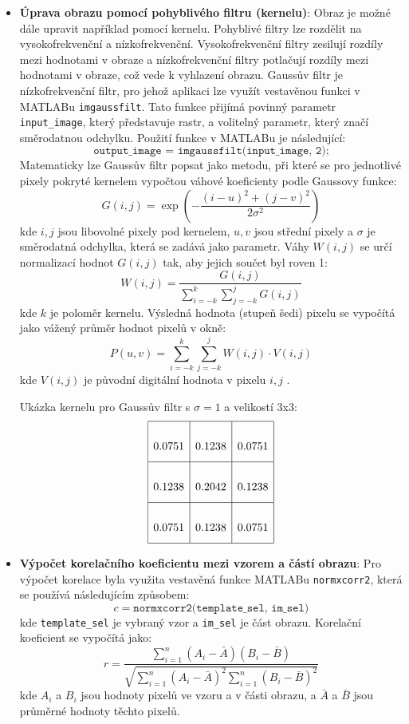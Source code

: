 \begin{itemize}
    \item \textbf{Úprava obrazu pomocí pohyblivého filtru (kernelu)}: Obraz je možné dále upravit například pomocí kernelu. Pohyblivé filtry lze rozdělit na vysokofrekvenční a nízkofrekvenční. Vysokofrekvenční filtry zesilují rozdíly mezi hodnotami v obraze a nízkofrekvenční filtry potlačují rozdíly mezi hodnotami v obraze, což vede k vyhlazení obrazu.\cite{DPZFiltrace} Gaussův filtr je nízkofrekvenční filtr, pro jehož aplikaci lze využít vestavěnou funkci v MATLABu \texttt{imgaussfilt}.\cite{mathworksGauss} Tato funkce přijímá povinný parametr \texttt{input\_image}, který představuje rastr, a volitelný parametr, který značí směrodatnou odchylku. Použití funkce v MATLABu je následující:
    \[
    \texttt{output\_image = imgaussfilt(input\_image, 2);}
    \]
    Matematicky lze Gaussův filtr popsat jako metodu, při které se pro jednotlivé pixely pokryté kernelem vypočtou váhové koeficienty podle Gaussovy funkce:
    \[
    G(i,j) = \exp\left(-\frac{(i-u)^2 + (j-v)^2}{2\sigma^2}\right)
    \]
    kde \(i, j\) jsou libovolné pixely pod kernelem, \(u, v\) jsou střední pixely a \(\sigma\) je směrodatná odchylka, která se zadává jako parametr. Váhy \(W(i, j)\) se určí normalizací hodnot \(G(i, j)\) tak, aby jejich součet byl roven 1:
    \[
    W(i, j) = \frac{G(i, j)}{\sum_{i=-k}^{k} \sum_{j=-k}^{j} G(i, j)}
    \]
    kde \(k\) je poloměr kernelu. Výsledná hodnota (stupeň šedi) pixelu se vypočítá jako vážený průměr hodnot pixelů v okně:
    \[
    P(u,v) = \sum_{i=-k}^{k} \sum_{j=-k}^{j} W(i,j) \cdot V(i,j)
    \]
    kde \(V(i, j)\) je původní digitální hodnota v pixelu \(i, j\) \cite{ZODHGauss}.
    
    Ukázka kernelu pro Gaussův filtr s \(\sigma = 1\) a velikostí 3x3:
    \[
    \renewcommand{\arraystretch}{3}
    \setlength{\tabcolsep}{10pt}
    \begin{array}{|c|c|c|}
        \hline
        0.0751 & 0.1238 & 0.0751 \\
        \hline
        0.1238 & 0.2042 & 0.1238 \\
        \hline
        0.0751 & 0.1238 & 0.0751 \\
        \hline
    \end{array}
    \]

    \item \textbf{Výpočet korelačního koeficientu mezi vzorem a částí obrazu}: Pro výpočet korelace byla využita vestavěná funkce MATLABu \texttt{normxcorr2}, která se používá následujícím způsobem:
    \[
    c = \texttt{normxcorr2(template\_sel, im\_sel)}
    \]
    kde \texttt{template\_sel} je vybraný vzor a \texttt{im\_sel} je část obrazu. Korelační koeficient se vypočítá jako:
    \[
    r = \frac{\sum_{i=1}^{n} (A_i - \bar{A})(B_i - \bar{B})}{\sqrt{\sum_{i=1}^{n} (A_i - \bar{A})^2 \sum_{i=1}^{n} (B_i - \bar{B})^2}}
    \]
    kde \(A_i\) a \(B_i\) jsou hodnoty pixelů ve vzoru a v části obrazu, a \(\bar{A}\) a \(\bar{B}\) jsou průměrné hodnoty těchto pixelů.


\end{itemize}
